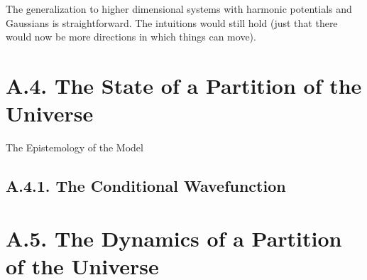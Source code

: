 \documentclass[11pt, a4paper]{article} %
\begin{document}
The generalization to higher dimensional systems with harmonic potentials and Gaussians is straightforward. The intuitions would still hold (just that there would now be more directions in which things can move).



\newpage
{}
\section*{A.4. The State of a Partition of the Universe}
 The Epistemology of the Model

\subsection*{A.4.1. The Conditional Wavefunction}

\newpage
{}
\section*{A.5. The Dynamics of a Partition of the Universe}

\end{document}
